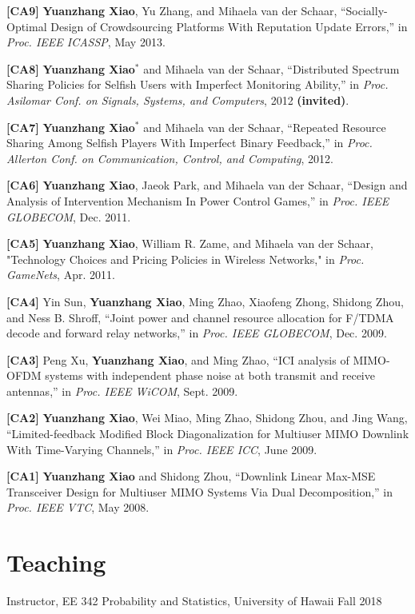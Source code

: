\documentclass[margin,line]{res}
\begin{document}
\begin{resume}
\textbf{[CA9]} {\bf Yuanzhang Xiao}, Yu Zhang, and Mihaela van der Schaar, ``Socially-Optimal Design of Crowdsourcing Platforms With Reputation
Update Errors,'' in \emph{Proc. IEEE ICASSP}, May 2013.

\textbf{[CA8]} {\bf Yuanzhang Xiao}$^*$ and Mihaela van der Schaar, ``Distributed Spectrum Sharing Policies for Selfish Users with Imperfect
Monitoring Ability,'' in \emph{Proc. Asilomar Conf. on Signals, Systems, and Computers}, 2012 {\bf (invited)}.

\textbf{[CA7]} {\bf Yuanzhang Xiao}$^*$ and Mihaela van der Schaar, ``Repeated Resource Sharing Among Selfish Players With Imperfect Binary
Feedback,'' in \emph{Proc. Allerton Conf. on Communication, Control, and Computing}, 2012.

\textbf{[CA6]} {\bf Yuanzhang Xiao}, Jaeok Park, and Mihaela van der Schaar, ``Design and Analysis of Intervention Mechanism In Power Control
Games,'' in \emph{Proc. IEEE GLOBECOM}, Dec. 2011.

\textbf{[CA5]} {\bf Yuanzhang Xiao}, William R. Zame, and Mihaela van der Schaar, "Technology Choices and Pricing Policies in Wireless Networks," in
\emph{Proc. GameNets}, Apr. 2011.

\textbf{[CA4]} Yin Sun, {\bf Yuanzhang Xiao}, Ming Zhao, Xiaofeng Zhong, Shidong Zhou, and Ness B. Shroff, ``Joint power and channel resource
allocation for F/TDMA decode and forward relay networks,'' in \emph{Proc. IEEE GLOBECOM}, Dec. 2009.

\textbf{[CA3]} Peng Xu, {\bf Yuanzhang Xiao}, and Ming Zhao, ``ICI analysis of MIMO-OFDM systems with independent phase noise at both transmit and
receive antennas,'' in \emph{Proc. IEEE WiCOM}, Sept. 2009.

\textbf{[CA2]} {\bf Yuanzhang Xiao}, Wei Miao, Ming Zhao, Shidong Zhou, and Jing Wang, ``Limited-feedback Modified Block Diagonalization for
Multiuser MIMO Downlink With Time-Varying Channels,'' in \emph{Proc. IEEE ICC}, June 2009.

\textbf{[CA1]} {\bf Yuanzhang Xiao} and Shidong Zhou, ``Downlink Linear Max-MSE Transceiver Design for Multiuser MIMO Systems Via Dual
Decomposition,'' in \emph{Proc. IEEE VTC}, May 2008.


\section{\sc Teaching}

Instructor, EE 342 Probability and Statistics, University of Hawaii \hfill Fall 2018


\end{resume}
\end{document}
